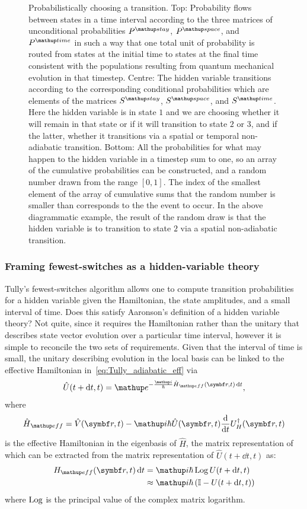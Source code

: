 \begin{figure}[t]
    \caption{Probabilistically choosing a transition. Top: Probability flows between states in a time interval according to the three matrices of unconditional probabilities $P^\up{stay}$, $P^\up{space}$, and $P^\up{time}$ in such a way that one total unit of probability is routed from states at the initial time to states at the final time consistent with the populations resulting from quantum mechanical evolution in that timestep. Centre: The hidden variable transitions according to the corresponding conditional probabilities which are elements of the matrices $S^\up{stay}$, $S^\up{space}$, and $S^\up{time}$. Here the hidden variable is in state $1$ and we are choosing whether it will remain in that state or if it will transition to state $2$ or $3$, and if the latter, whether it transitions via a spatial or temporal non-adiabatic transition. Bottom: All the probabilities for what may happen to the hidden variable in a timestep sum to one, so an array of the cumulative probabilities can be constructed, and a random number drawn from the range $[0,1]$. The index of the smallest element of the array of cumulative sums that the random number is smaller than corresponds to the the event to occur. In the above diagrammatic example, the result of the random draw is that the hidden variable is to transition to state $2$ via a spatial non-adiabatic transition.}\label{fig:random_choice}
\end{figure}

\subsubsection{Framing fewest-switches as a hidden-variable theory}

Tully's fewest-switches algorithm allows one to compute transition probabilities for a hidden variable given the Hamiltonian, the state amplitudes, and a small interval of time. Does this satisfy Aaronson's definition of a hidden variable theory? Not quite, since it requires the Hamiltonian rather than the unitary that describes state vector evolution over a particular time interval, however it is simple to reconcile the two sets of requirements. Given that the interval of time is small, the unitary describing evolution in the local basis can be linked to the effective Hamiltonian in~\eqref{eq:Tully_adiabatic_eff} via
\begin{align}
\hat U(t+\dd t, t) = \ee^{-\frac\ii\hbar\hat H_\up{eff}(\vec r, t)\,\dd t},
\end{align}
where
\begin{align}
\hat H_\up{eff} = \hat V(\vec r, t)
  - \ii\hbar\hat U(\vec r, t)\dv{t}U^\dagger_H(\vec r, t)
\end{align}
is the effective Hamiltonian in the eigenbasis of $\hat H$, the matrix representation of which can be extracted from the matrix representation of $\hat U(t+\dd t, t)$ as:
\begin{align}
H_\up{eff}(\vec r, t)\,\dd t &= \ii\hbar\Log U(t+\dd t, t)\\
&\approx \ii\hbar\left(\mathbb{I} -  U(t+\dd t, t)\right)
\end{align}
where $\operatorname{Log}$ is the principal value of the complex matrix logarithm.

